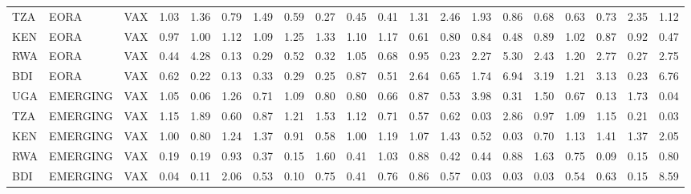 \documentclass[a4paper]{article}
\begin{document}
\begin{table}[ht]
{\begin{tabular}{lllrrrrrrrrrrrrrrrrr}
  TZA & EORA & VAX & 1.03 & 1.36 & 0.79 & 1.49 & 0.59 & 0.27 & 0.45 & 0.41 & 1.31 & 2.46 & 1.93 & 0.86 & 0.68 & 0.63 & 0.73 & 2.35 & 1.12 \\ 
  KEN & EORA & VAX & 0.97 & 1.00 & 1.12 & 1.09 & 1.25 & 1.33 & 1.10 & 1.17 & 0.61 & 0.80 & 0.84 & 0.48 & 0.89 & 1.02 & 0.87 & 0.92 & 0.47 \\ 
  RWA & EORA & VAX & 0.44 & 4.28 & 0.13 & 0.29 & 0.52 & 0.32 & 1.05 & 0.68 & 0.95 & 0.23 & 2.27 & 5.30 & 2.43 & 1.20 & 2.77 & 0.27 & 2.75 \\ 
  BDI & EORA & VAX & 0.62 & 0.22 & 0.13 & 0.33 & 0.29 & 0.25 & 0.87 & 0.51 & 2.64 & 0.65 & 1.74 & 6.94 & 3.19 & 1.21 & 3.13 & 0.23 & 6.76 \\ \midrule
    UGA & EMERGING & VAX & 1.05 & 0.06 & 1.26 & 0.71 & 1.09 & 0.80 & 0.80 & 0.66 & 0.87 & 0.53 & 3.98 & 0.31 & 1.50 & 0.67 & 0.13 & 1.73 & 0.04 \\ 
  TZA & EMERGING & VAX & 1.15 & 1.89 & 0.60 & 0.87 & 1.21 & 1.53 & 1.12 & 0.71 & 0.57 & 0.62 & 0.03 & 2.86 & 0.97 & 1.09 & 1.15 & 0.21 & 0.03 \\ 
  KEN & EMERGING & VAX & 1.00 & 0.80 & 1.24 & 1.37 & 0.91 & 0.58 & 1.00 & 1.19 & 1.07 & 1.43 & 0.52 & 0.03 & 0.70 & 1.13 & 1.41 & 1.37 & 2.05 \\ 
  RWA & EMERGING & VAX & 0.19 & 0.19 & 0.93 & 0.37 & 0.15 & 1.60 & 0.41 & 1.03 & 0.88 & 0.42 & 0.44 & 0.88 & 1.63 & 0.75 & 0.09 & 0.15 & 0.80 \\ 
  BDI & EMERGING & VAX & 0.04 & 0.11 & 2.06 & 0.53 & 0.10 & 0.75 & 0.41 & 0.76 & 0.86 & 0.57 & 0.03 & 0.03 & 0.03 & 0.54 & 0.63 & 0.15 & 8.59 \\ \midrule
  

\end{tabular}}
\end{table}
\end{document}
